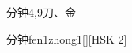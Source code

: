 \begin{entry}{分钟}{4,9}{⼑、⾦}
  \begin{phonetics}{分钟}{fen1zhong1}[][HSK 2]
  \end{phonetics}
\end{entry}
